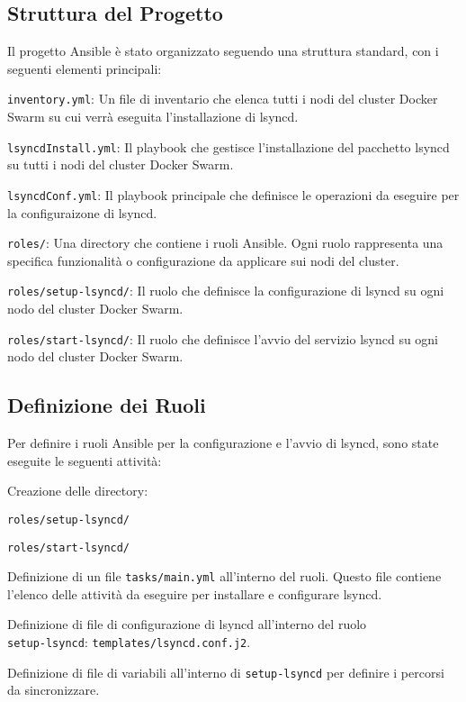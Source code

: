 \documentclass[a4paper, 12pt]{article}
\newenvironment{packed_itemize}{
\begin{itemize}
        \setlength{\itemsep}{1pt}
        \setlength{\parskip}{0pt}
        \setlength{\parsep}{0pt}
}{\end{itemize}}
\begin{document}
\subsection{Struttura del Progetto}
Il progetto Ansible è stato organizzato seguendo una struttura standard, 
con i seguenti elementi principali:
\begin{packed_itemize}
  \item \texttt{inventory.yml}: Un file di inventario che elenca tutti i nodi del 
    cluster Docker Swarm su cui verrà eseguita l'installazione di lsyncd.
  \item \texttt{lsyncdInstall.yml}: Il playbook che gestisce l'installazione
    del pacchetto lsyncd su tutti i nodi del cluster Docker Swarm.
  \item \texttt{lsyncdConf.yml}: Il playbook principale che definisce le operazioni da 
    eseguire per la configuraizone di lsyncd.
  \item \texttt{roles/}: Una directory che contiene i ruoli Ansible. 
    Ogni ruolo rappresenta una specifica funzionalità o configurazione da applicare 
    sui nodi del cluster.
  \item \texttt{roles/setup-lsyncd/}: Il ruolo che definisce la configurazione
    di lsyncd su ogni nodo del cluster Docker Swarm.
  \item \texttt{roles/start-lsyncd/}: Il ruolo che definisce l'avvio del
    servizio lsyncd su ogni nodo del cluster Docker Swarm.
\end{packed_itemize}

\subsection{Definizione dei Ruoli}
Per definire i ruoli Ansible per la configurazione e l'avvio di lsyncd, 
sono state eseguite le seguenti attività:
\begin{packed_itemize}
  \item Creazione delle directory:
  \begin{packed_itemize}
    \item \texttt{roles/setup-lsyncd/}
    \item \texttt{roles/start-lsyncd/}
  \end{packed_itemize}
  \item Definizione di un file \texttt{tasks/main.yml} all'interno del ruoli. 
    Questo file contiene l'elenco delle attività da eseguire per installare e configurare lsyncd.
  \item Definizione di file di configurazione di lsyncd all'interno del ruolo \\ 
    \texttt{setup-lsyncd}: \texttt{templates/lsyncd.conf.j2}.
  \item Definizione di file di variabili all'interno di \texttt{setup-lsyncd} per definire
    i percorsi da sincronizzare.
\end{packed_itemize}
\end{document}
